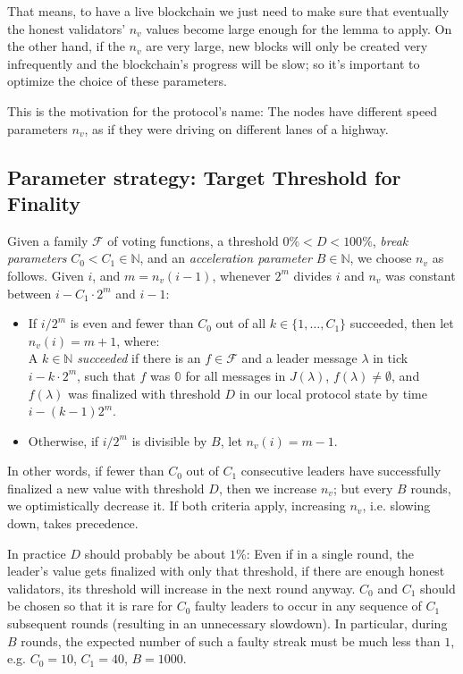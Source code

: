 \documentclass[12pt, fleqn]{article}
\begin{document}
That means, to have a live blockchain we just need to make sure that eventually the honest validators' $n_v$ values become large enough for the lemma to apply. On the other hand, if the $n_v$ are very large, new blocks will only be created very infrequently and the blockchain's progress will be slow; so it's important to optimize the choice of these parameters.

This is the motivation for the protocol's name: The nodes have different speed parameters $n_v$, as if they were driving on different lanes of a highway.


\subsection{Parameter strategy: Target Threshold for Finality}

Given a family $\mathcal{F}$ of voting functions, a threshold $0\% < D < 100\%$, \emph{break parameters} $C_0 < C_1 \in \mathbb{N}$, and an \emph{acceleration parameter} $B \in \mathbb{N}$, we choose $n_v$ as follows. Given $i$, and $m = n_v(i - 1)$, whenever $2^m$ divides $i$ and $n_v$ was constant between $i - C_1 \cdot 2^m$ and $i - 1$:
\begin{itemize}
  \item If $i/2^m$ is even and fewer than $C_0$ out of all $k \in \{1, \ldots, C_1\}$ succeeded, then let $n_v(i) = m + 1$, where:\\
    A $k \in \mathbb{N}$ \emph{succeeded} if there is an $f \in \mathcal{F}$ and a leader message $\lambda$ in tick $i - k \cdot 2^m$, such that $f$ was $\mathbb{0}$ for all messages in $J(\lambda)$, $f(\lambda) \neq \emptyset$, and $f(\lambda)$ was finalized with threshold $D$ in our local protocol state by time $i - (k - 1) 2^m$.
  \item Otherwise, if $i/2^m$ is divisible by $B$, let $n_v(i) = m - 1$.
\end{itemize}
In other words, if fewer than $C_0$ out of $C_1$ consecutive leaders have successfully finalized a new value with threshold $D$, then we increase $n_v$; but every $B$ rounds, we optimistically decrease it. If both criteria apply, increasing $n_v$, i.e. slowing down, takes precedence.

In practice $D$ should probably be about $1\%$: Even if in a single round, the leader's value gets finalized with only that threshold, if there are enough honest validators, its threshold will increase in the next round anyway. $C_0$ and $C_1$ should be chosen so that it is rare for $C_0$ faulty leaders to occur in any sequence of $C_1$ subsequent rounds (resulting in an unnecessary slowdown). In particular, during $B$ rounds, the expected number of such a faulty streak must be much less than $1$, e.g. $C_0 = 10$, $C_1 = 40$, $B = 1000$.
\end{document}
